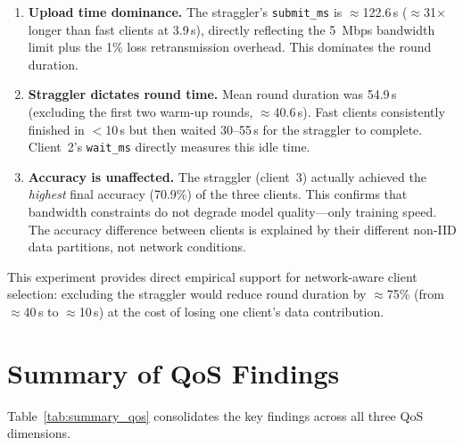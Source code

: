 \documentclass[12pt,a4paper]{report}
\begin{document}
\begin{enumerate}
  \item \textbf{Upload time dominance.}  The straggler's
        \texttt{submit\_ms} is $\approx$122.6\,s ($\approx$31$\times$
        longer than fast clients at 3.9\,s), directly reflecting the
        5~Mbps bandwidth limit plus the 1\% loss retransmission overhead.
        This dominates the round duration.

  \item \textbf{Straggler dictates round time.}  Mean round duration was
        54.9\,s (excluding the first two warm-up rounds, $\approx$40.6\,s).
        Fast clients consistently finished in $<$10\,s but then waited
        30--55\,s for the straggler to complete.  Client~2's
        \texttt{wait\_ms} directly measures this idle time.

  \item \textbf{Accuracy is unaffected.}  The straggler (client~3) actually
        achieved the \emph{highest} final accuracy (70.9\%) of the three
        clients.  This confirms that bandwidth constraints do not degrade
        model quality---only training speed.  The accuracy difference
        between clients is explained by their different non-IID data
        partitions, not network conditions.
\end{enumerate}

This experiment provides direct empirical support for network-aware client
selection: excluding the straggler would reduce round duration by
$\approx$75\% (from $\approx$40\,s to $\approx$10\,s) at the cost of
losing one client's data contribution.

\section{Summary of QoS Findings}

Table~\ref{tab:summary_qos} consolidates the key findings across all
three QoS dimensions.
\end{document}
